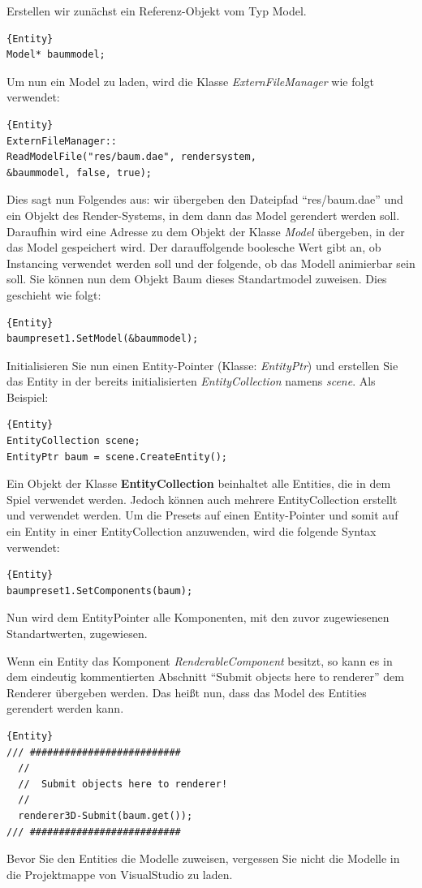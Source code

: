 Erstellen wir zunächst ein Referenz-Objekt vom Typ Model.
\begin{lstlisting}{Entity}
Model* baummodel;
\end{lstlisting}
Um nun ein Model zu laden, wird die Klasse \textit{ExternFileManager} wie folgt verwendet:
\begin{lstlisting}{Entity}
ExternFileManager::
ReadModelFile("res/baum.dae", rendersystem,
&baummodel, false, true);
\end{lstlisting}
Dies sagt nun Folgendes aus:
wir übergeben den Dateipfad "`res/baum.dae"' und ein Objekt des Render-Systems, in dem dann das Model gerendert werden soll. Daraufhin wird eine Adresse zu dem Objekt der Klasse \textit{Model} übergeben, in der das Model gespeichert wird. Der darauffolgende boolesche Wert gibt an, ob Instancing verwendet werden soll und der folgende, ob das Modell animierbar sein soll. Sie können nun dem Objekt Baum dieses Standartmodel zuweisen. Dies geschieht wie folgt:
\begin{lstlisting}{Entity}
baumpreset1.SetModel(&baummodel);
\end{lstlisting}
Initialisieren Sie nun einen Entity-Pointer (Klasse: \textit{EntityPtr}) und erstellen Sie das Entity in der bereits initialisierten \textit{EntityCollection} namens \textit{scene}. Als Beispiel:
\begin{lstlisting}{Entity}
EntityCollection scene;
EntityPtr baum = scene.CreateEntity();
\end{lstlisting}
Ein Objekt der Klasse \textbf{EntityCollection} beinhaltet alle Entities, die in dem Spiel verwendet werden. Jedoch können auch mehrere EntityCollection erstellt und verwendet werden.
Um die Presets auf einen Entity-Pointer und somit auf ein Entity in einer EntityCollection anzuwenden, wird die folgende Syntax verwendet:
\begin{lstlisting}{Entity}
baumpreset1.SetComponents(baum);
\end{lstlisting}
Nun wird dem EntityPointer alle Komponenten, mit den zuvor zugewiesenen Standartwerten, zugewiesen.

Wenn ein Entity das Komponent \textit{RenderableComponent} besitzt, so kann es in dem eindeutig kommentierten Abschnitt "`Submit objects here to renderer"' dem Renderer übergeben werden. Das heißt nun, dass das Model des Entities gerendert werden kann.
\begin{lstlisting}{Entity}
/// ##########################
  //
  //  Submit objects here to renderer!
  //
  renderer3D-Submit(baum.get());
/// ##########################
\end{lstlisting}
Bevor Sie den Entities die Modelle zuweisen, vergessen Sie nicht die Modelle in die Projektmappe von VisualStudio zu laden.

